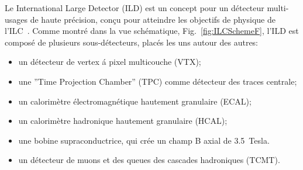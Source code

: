 Le International Large Detector (ILD) est un concept pour un détecteur multi-usages de haute précision, conçu pour atteindre les objectifs de physique de l'ILC~\cite{Behnke:2013lya}.
Comme montr\'e dans la vue schématique, Fig.~\ref {fig:ILCSchemeF}, l’ILD est compos\'e de plusieurs sous-d\'etecteurs, plac\'es les uns autour des autres:
\begin{itemize}
	\item un d\'etecteur de vertex \'a pixel multicouche (VTX);
	\item une ”Time Projection Chamber” (TPC) comme d\'etecteur des traces centrale;
	\item un calorim\`etre \'electromagn\'etique hautement granulaire (ECAL);
	\item un calorim\`etre hadronique hautement granulaire (HCAL);
	\item une bobine supraconductrice, qui cr\'ee un champ B axial de 3.5~Tesla.
	\item un d\'etecteur de muons et des queues des cascades hadroniques (TCMT).
\end{itemize}

